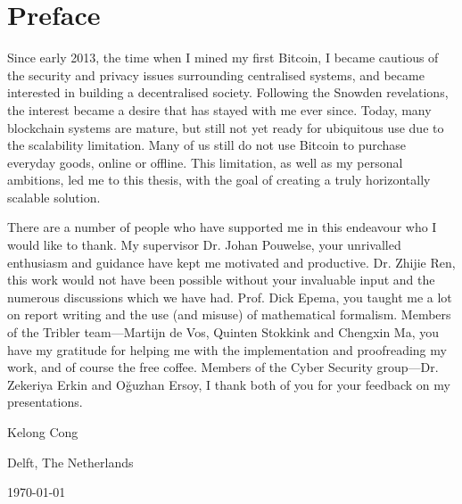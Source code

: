 \chapter*{Preface}
Since early 2013, the time when I mined my first Bitcoin, 
I became cautious of the security and privacy issues surrounding centralised systems,
and became interested in building a decentralised society.
Following the Snowden revelations, the interest became a desire that has stayed with me ever since.
Today, many blockchain systems are mature, but still not yet ready for ubiquitous use due to the scalability limitation.
Many of us still do not use Bitcoin to purchase everyday goods, online or offline.
This limitation, as well as my personal ambitions, led me to this thesis,
with the goal of creating a truly horizontally scalable solution.

\vspace{1\baselineskip}

\noindent
There are a number of people who have supported me in this endeavour who I would like to thank.
My supervisor Dr. Johan Pouwelse, your unrivalled enthusiasm and guidance have kept me motivated and productive.
Dr. Zhijie Ren, this work would not have been possible without your invaluable input and the numerous discussions which we have had.
Prof. Dick Epema, you taught me a lot on report writing and the use (and misuse) of mathematical formalism.
Members of the Tribler team---Martijn de Vos, Quinten Stokkink and Chengxin Ma,
you have my gratitude for helping me with the implementation and proofreading my work,
and of course the free coffee.
Members of the Cyber Security group---Dr. Zekeriya Erkin and O\u{g}uzhan Ersoy,
I thank both of you for your feedback on my presentations.

\vspace{1\baselineskip}

\noindent
Kelong Cong

\vspace{1\baselineskip}

\noindent
Delft, The Netherlands

\noindent
\today
